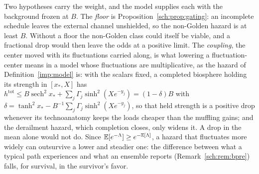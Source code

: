 \begin{remark}
Two hypotheses carry the weight, and the model supplies each with the background frozen at $B$. The
\emph{floor} is Proposition~\ref{sch:prop:gating}: an incomplete
schedule leaves the external channel unshielded, so the
non-Golden hazard is at least $B$. Without a floor the non-Golden
class could itself be viable, and a fractional drop would then leave the
odds at a positive limit. The \emph{coupling}, the center moved with its
fluctuations carried along, is what lowering a fluctuation-center means
in a model whose fluctuations are multiplicative, as the hazard of
Definition~\ref{imp:model} is: with the scalars fixed, a completed biosphere
holding its strength in $[x_\ast,X]$ has
$h^{\mathrm{tot}}\le B\operatorname{sech}^2x_\ast+\sum_j\Gamma_j\sinh^2(Xe^{-y_j})=(1-\delta)B$
with $\delta=\tanh^2x_\ast-B^{-1}\sum_j\Gamma_j\sinh^2(Xe^{-y_j})$, so that
held strength is a positive drop whenever its technoanatomy keeps the
loads cheaper than the muffling gains; and the derailment hazard,
which completion closes, only widens it. A drop in the mean alone would
not do. Since $\mathbb{E}[e^{-\Lambda}]\ge e^{-\mathbb{E}[\Lambda]}$, a hazard that
fluctuates more widely can outsurvive a lower and steadier one: the
difference between what a typical path experiences and what an ensemble
reports (Remark~\ref{sch:rem:bpre}) falls, for survival, in the
survivor's favor.
\end{remark}

